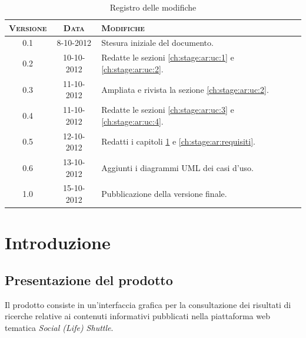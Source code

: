 \documentclass[10pt,a4paper,headinclude,footinclude,hidelinks]{scrreprt} %
\begin{document}
    \title{\rmfamily\normalfont{}}
    \author{}
    \date{\today}
    
    \maketitle
    
    \begin{abstract}
        \noindent Il documento illustra i casi d'uso e i requisiti dell'interfaccia grafica per la visualizzazione e la navigazione dei contenuti.
    \end{abstract}
    
	\begin{table}[ht]
	\centering
	\begin{tabular}{|c|c|l|}
	\hline
	\textsc{Versione} & \textsc{Data} & \textsc{Modifiche} \\ \hline
	0.1 & 8-10-2012 & Stesura iniziale del documento. \\ \hline
	0.2 & 10-10-2012 & Redatte le sezioni \ref{ch:stage:ar:uc:1} e \ref{ch:stage:ar:uc:2}. \\ \hline
	0.3 & 11-10-2012 & Ampliata e rivista la sezione \ref{ch:stage:ar:uc:2}. \\ \hline
	0.4 & 11-10-2012 & Redatte le sezioni \ref{ch:stage:ar:uc:3} e \ref{ch:stage:ar:uc:4}. \\ \hline
	0.5 & 12-10-2012 & Redatti i capitoli \ref{ch:stage:ar:intro} e \ref{ch:stage:ar:requisiti}. \\ \hline
	0.6 & 13-10-2012 & Aggiunti i diagrammi UML dei casi d'uso. \\ \hline
	1.0 & 15-10-2012 & Pubblicazione della versione finale. \\ \hline
	\end{tabular}
	\caption{Registro delle modifiche}
	\label{tab:stage:wp:workload}
	\end{table}

	\tableofcontents

	\listoffigures

	\chapter{Introduzione}
	\label{ch:stage:ar:intro}

	\section{Presentazione del prodotto}
	\label{sec:stage:ar:intro:presentazione}
	Il prodotto consiste in un'interfaccia grafica per la consultazione dei risultati di ricerche relative ai contenuti informativi pubblicati nella piattaforma web tematica \textit{Social (Life) Shuttle}.
\end{document}
